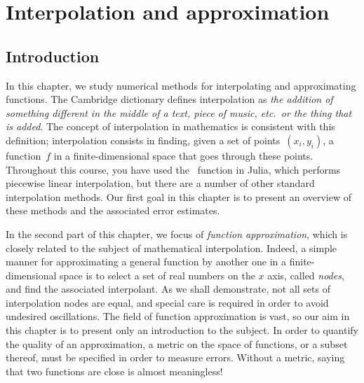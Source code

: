 \chapter{Interpolation and approximation}%
\label{cha:interpolation_and_approximation}

\minitoc

\section*{Introduction}
In this chapter,
we study numerical methods for interpolating and approximating functions.
The Cambridge dictionary defines interpolation as \emph{the addition of something different in the middle of a text, piece of music, etc.~or the thing that is added}.
The concept of interpolation in mathematics is consistent with this definition;
interpolation consists in finding, given a set of points~$(x_i, y_i)$,
a function~$f$ in a finite-dimensional space that goes through these points.
Throughout this course, you have used the~ function in Julia,
which performs piecewise linear interpolation,
but there are a number of other standard interpolation methods.
Our first goal in this chapter is to present an overview of these methods and the associated error estimates.

In the second part of this chapter,
we focus of \emph{function approximation},
which is closely related to the subject of mathematical interpolation.
Indeed, a simple manner for approximating a general function by another one in a finite-dimensional space is to select a set of real numbers on the $x$ axis,
called \emph{nodes}, and find the associated interpolant.
As we shall demonstrate, not all sets of interpolation nodes are equal,
and special care is required in order to avoid undesired oscillations.
The field of function approximation is vast,
so our aim in this chapter is to present only an introduction to the subject.
In order to quantify the quality of an approximation,
a metric on the space of functions,
or a subset thereof, must be specified in order to measure errors.
Without a metric, saying that two functions are close is almost meaningless!

